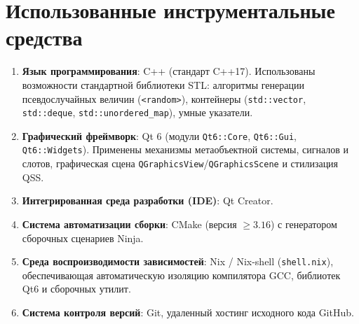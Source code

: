 \documentclass[11pt, a4paper]{article}
\begin{document}
\section{Использованные инструментальные средства}
\begin{enumerate}
  \item \textbf{Язык программирования}: C++ (стандарт C++17). Использованы возможности стандартной библиотеки STL: алгоритмы генерации псевдослучайных величин (\texttt{<random>}), контейнеры (\texttt{std::vector}, \texttt{std::deque}, \texttt{std::unordered\_map}), умные указатели.
  \item \textbf{Графический фреймворк}: Qt 6 (модули \texttt{Qt6::Core}, \texttt{Qt6::Gui}, \texttt{Qt6::Widgets}). Применены механизмы метаобъектной системы, сигналов и слотов, графическая сцена \texttt{QGraphicsView}/\texttt{QGraphicsScene} и стилизация QSS.
  \item \textbf{Интегрированная среда разработки (IDE)}: Qt Creator.
  \item \textbf{Система автоматизации сборки}: CMake (версия $\ge 3.16$) с генератором сборочных сценариев Ninja.
  \item \textbf{Среда воспроизводимости зависимостей}: Nix / Nix-shell (\texttt{shell.nix}), обеспечивающая автоматическую изоляцию компилятора GCC, библиотек Qt6 и сборочных утилит.
  \item \textbf{Система контроля версий}: Git, удаленный хостинг исходного кода GitHub.
\end{enumerate}
\end{document}
